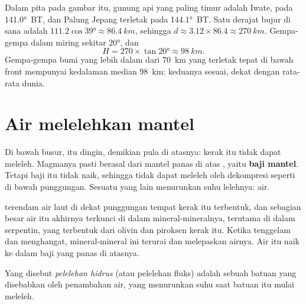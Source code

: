 \begin{example}\label{ex:g12:subduction-magmatism:japan}
Dalam pita pada gambar itu, gunung api yang paling timur adalah Iwate, pada
\ang{141.0}~BT, dan Palung Jepang terletak pada \ang{144.1}~BT. Satu derajat
bujur di sana adalah
$111.2\cos\ang{39} \approx \qty{86.4}{km}$, sehingga $d \approx 3.12 \times 86.4
\approx \qty{270}{km}$. Gempa-gempa dalam miring sekitar \ang{20}, dan
\[
  H = 270 \times \tan\ang{20} \approx \qty{98}{km}.
\]
Gempa-gempa bumi yang lebih dalam dari \qty{70}{km} yang terletak tepat di
bawah front mempunyai kedalaman median \qty{98}{km}: keduanya sesuai, dekat
dengan rata-rata dunia.
\end{example}

\section{Air melelehkan mantel}

Di bawah busur,  itu dingin, demikian pula  di atasnya:
kerak itu tidak dapat meleleh. Magmanya pasti berasal dari mantel panas di atas
, yaitu \textbf{baji mantel}. Tetapi baji itu tidak naik, sehingga
tidak dapat meleleh oleh dekompresi seperti di bawah punggungan. Sesuatu yang
lain menurunkan suhu lelehnya: air.

 terendam air laut di dekat punggungan tempat kerak itu terbentuk,
dan sebagian besar air itu akhirnya terkunci di dalam mineral-mineralnya,
terutama di dalam serpentin, yang terbentuk dari olivin dan piroksen kerak itu.
Ketika  tenggelam dan menghangat, mineral-mineral ini terurai dan
melepaskan airnya. Air itu naik ke dalam  baji yang panas di atasnya.

\begin{definition}\label{def:g12:subduction-magmatism:hydrous-melting}
Yang disebut \emph{pelelehan hidrus} (atau pelelehan
fluks) adalah  sebuah batuan yang disebabkan oleh penambahan
air, yang menurunkan suhu saat batuan itu mulai meleleh.
\end{definition}

